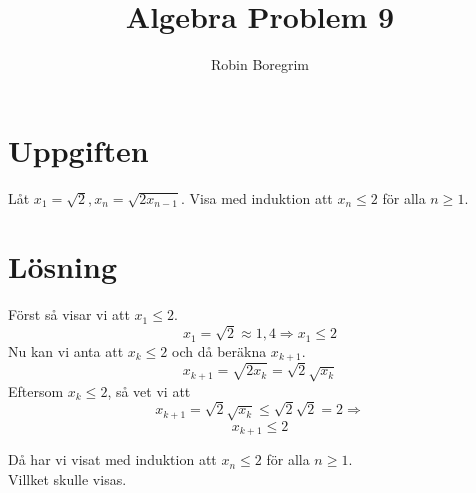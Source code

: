 \documentclass[11pt]{article}
\begin{document}
\title{Algebra Problem 9}
\author{Robin Boregrim}
\maketitle
\renewcommand{\contentsname}{Innehållsförteckning}
\tableofcontents
\newpage
\section{Uppgiften}
Låt $x_1 = \sqrt{2}, x_n = \sqrt{2 x_{n-1}}$. Visa med induktion att $x_n \leq 2$ för alla $n\geq 1$.
\section{Lösning}
Först så visar vi att $x_1 \leq 2.$
$$x_1 = \sqrt{2} \approx 1,4 \Rightarrow x_1 \leq 2$$
Nu kan vi anta att $x_k \leq 2$ och då beräkna $x_{k+1}$.
$$x_{k+1} = \sqrt{2x_k} = \sqrt{2} \sqrt{x_k}$$
Eftersom $x_k \leq 2$, så vet vi att
$$x_{k+1} = \sqrt{2} \sqrt{x_k} \leq \sqrt{2} \sqrt{2} = 2 \Rightarrow$$
$$x_{k+1} \leq 2$$

Då har vi visat med induktion att $x_n \leq 2$ för alla $n \geq 1$.\\
Villket skulle visas.
\end{document}
